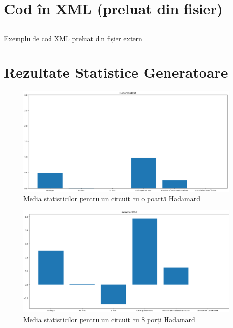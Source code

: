 \newpage
\section{Cod în XML (preluat din fisier)}
\label{anexa8:listing_xml}

\begin{code}
    \inputminted{xml}{anexe/coduri_sursa/pom.xml}
    \caption{Exemplu de cod XML preluat din fișier extern}
    \label{code:xml_pom}
\end{code}
\fi


\section{Rezultate Statistice Generatoare}
\label{anexa1:rez_stat_gens}
\begin{figure}[H]
    \centering
    \includegraphics[width=1.0\textwidth]{continut/capitol4/figuri/StatsHadamard1Bit.png}
    \caption{Media statisticilor pentru un circuit cu o poartă Hadamard}
    \label{fig:StatsBarHadamard1Bit}
\end{figure}

\begin{figure}[H]
    \centering
    \includegraphics[width=1.0\textwidth]{continut/capitol4/figuri/StatsHadamard8Bit.png}
    \caption{Media statisticilor pentru un circuit cu 8 porți Hadamard}
    \label{fig:StatsBarHadamard8Bit}
\end{figure}

